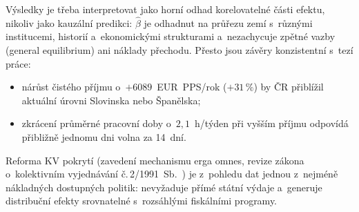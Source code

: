 Výsledky je třeba interpretovat jako horní odhad korelovatelné části efektu, nikoliv jako kauzální predikci: $\hat{\beta}$ je odhadnut na průřezu zemí s~různými institucemi, historií a~ekonomickými strukturami a~nezachycuje zpětné vazby (general equilibrium) ani náklady přechodu.
Přesto jsou závěry konzistentní s~tezí práce:
\begin{itemize}
  \item nárůst čistého příjmu o~$+\num{6089}$~EUR~PPS/rok ($+31\,\%$) by ČR přiblížil aktuální úrovni Slovinska nebo Španělska;
  \item zkrácení průměrné pracovní doby o~$2{,}1$~h/týden při vyšším příjmu odpovídá přibližně jednomu dni volna za 14~dní.
\end{itemize}
Reforma \ac{KV} pokrytí (zavedení mechanismu erga omnes, revize zákona o~kolektivním vyjednávání č.\,2/1991~Sb.~\cite{zakon_kv_1991}) je z~pohledu dat jednou z~nejméně nákladných dostupných politik: nevyžaduje přímé státní výdaje a~generuje distribuční efekty srovnatelné s~rozsáhlými fiskálními programy.
